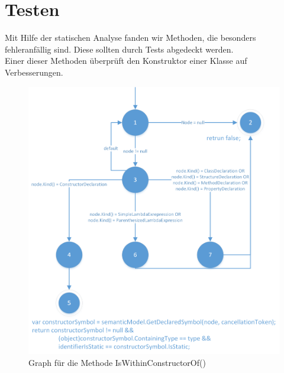 %
\section{Testen}
Mit Hilfe der statischen Analyse fanden wir Methoden, die besonders fehleranfällig sind. Diese sollten durch Tests abgedeckt werden.\\
Einer dieser Methoden überprüft den Konstruktor einer Klasse auf Verbesserungen. 

\begin{figure}[ht]
	\centering
	\includegraphics[width=\textwidth]{images/GraphIsWithinConstructorOf.png}
	\caption{Graph für die Methode IsWithinConstructorOf()}
	\label{fig:graph-constructor}
\end{figure}



